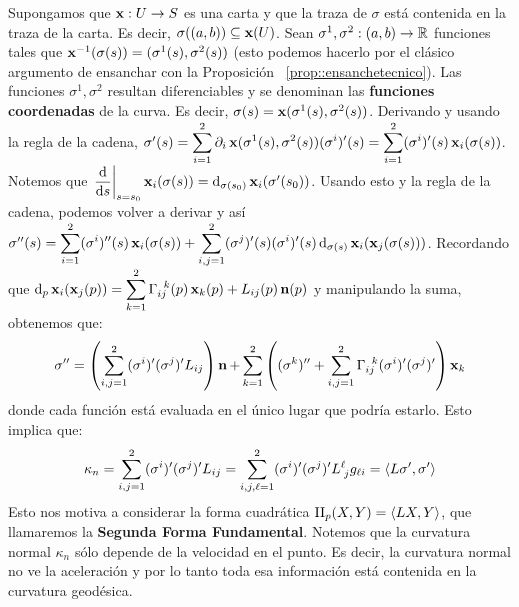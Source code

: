 Supongamos que $\operatorname{\mathbf{x}}:U\to S$ es una carta y que la traza de $\sigma$ está contenida en la traza de la carta. Es decir, $\sigma((a,b))\subseteq\operatorname{\mathbf{x}}(U)$. Sean $\sigma^1,\sigma^2:(a,b)\to\mathbb{R}$ funciones tales que $\operatorname{\mathbf{x}}^{-1}(\sigma(s))=(\sigma^1(s),\sigma^2(s))$ (esto podemos hacerlo por el clásico argumento de ensanchar con la Proposición ~\ref{prop::ensanchetecnico}). Las funciones $\sigma^1,\sigma^2$ resultan diferenciables y se denominan las \textbf{funciones coordenadas} de la curva. Es decir, $\sigma(s)=\operatorname{\mathbf{x}}(\sigma^1(s),\sigma^2(s))$. Derivando y usando la regla de la cadena, $\sigma'(s)=\displaystyle\sum_{i=1}^2 \partial_i\operatorname{\mathbf{x}}(\sigma^1(s),\sigma^2(s))(\sigma^i)'(s) = \displaystyle\sum_{i=1}^2 (\sigma^i)'(s)\operatorname{\mathbf{x}}_i(\sigma(s))$. Notemos que $\left.\dfrac{\mathop{}\!\mathrm{d}}{\mathop{}\!\mathrm{d} s}\right\rvert_{s=s_0} \operatorname{\mathbf{x}}_i(\sigma(s)) = \mathop{}\!\mathrm{d}_{\sigma(s_0)}\operatorname{\mathbf{x}}_i(\sigma'(s_0))$. Usando esto y la regla de la cadena, podemos volver a derivar y así $\sigma''(s)=\displaystyle\sum_{i=1}^2 (\sigma^i)''(s)\operatorname{\mathbf{x}}_i(\sigma(s)) + \displaystyle\sum_{i,j=1}^2 (\sigma^j)'(s)(\sigma^i)'(s) \mathop{}\!\mathrm{d}_{\sigma(s)}\operatorname{\mathbf{x}}_i(\operatorname{\mathbf{x}}_j(\sigma(s)))$. Recordando que $\mathop{}\!\mathrm{d}_p \operatorname{\mathbf{x}}_i(\operatorname{\mathbf{x}}_j(p)) = \displaystyle\sum_{k=1}^2 \Gamma_{ij}^{\;\;k}(p)\operatorname{\mathbf{x}}_k(p) + L_{ij}(p)\operatorname{\mathbf{n}}(p)$ y manipulando la suma, obtenemos que: $$\sigma''=\left(\displaystyle\sum_{i,j=1}^2 (\sigma^i)'(\sigma^j)'L_{ij}\right)\operatorname{\mathbf{n}} + \displaystyle\sum_{k=1}^2 \left((\sigma^k)'' + \displaystyle\sum_{i,j=1}^2 \Gamma_{ij}^{\;\;k}(\sigma^i)'(\sigma^j)'\right)\operatorname{\mathbf{x}}_k$$ donde cada función está evaluada en el único lugar que podría estarlo. Esto implica que: $$\kappa_n = \displaystyle\sum_{i,j=1}^2 (\sigma^i)'(\sigma^j)'L_{ij} = \displaystyle\sum_{i,j,\ell=1}^2 (\sigma^i)'(\sigma^j)'L^{\ell}_{\;j}g_{\ell i} = \left\langle L\sigma',\sigma' \right\rangle$$ Esto nos motiva a considerar la forma cuadrática $\mathrm{II}_p(X,Y)=\left\langle LX,Y \right\rangle$, que llamaremos la \textbf{Segunda Forma Fundamental}. Notemos que la curvatura normal $\kappa_n$ sólo depende de la velocidad en el punto. Es decir, la curvatura normal no ve la aceleración y por lo tanto toda esa información está contenida en la curvatura geodésica.

